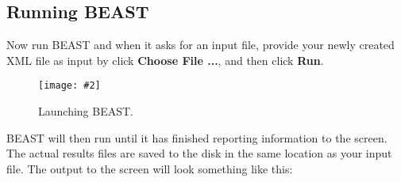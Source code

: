 \documentclass{article}
\newcommand{\includeimage}[2][]{%
\texttt{[image: \#2]}
}
\begin{document}
\subsection*{Running BEAST }

Now run BEAST and when it asks for an input file, provide your newly
created XML file as input by click \textbf{Choose File ...}, and then click \textbf{Run}. 

\begin{figure}
\centering
\includeimage[width=0.8\textwidth]{figures/BEAST}

\caption{\label{fig.BEAST} Launching BEAST.}
\end{figure}


BEAST will then run until it has finished
reporting information to the screen. The actual results files are
saved to the disk in the same location as your input file. The output to the screen will
look something like this: 
\end{document}
